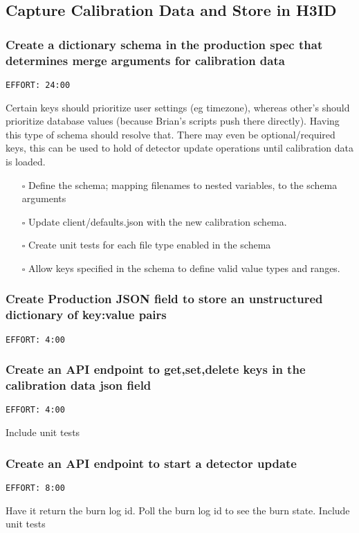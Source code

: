 \documentclass[11pt]{article}
\begin{document}
\subsection{Capture Calibration Data and Store in H3ID}
\label{sec:orgfa391fa}
\subsubsection{Create a dictionary schema in the production spec that determines merge arguments for calibration data}
\label{sec:org3dd4fc3}
\begin{verbatim}
EFFORT: 24:00
\end{verbatim}
Certain keys should prioritize user settings (eg timezone), whereas other's should prioritize
database values (because Brian's scripts push there directly). Having this type of schema should
resolve that.  There may even be optional/required keys, this can be used to hold of detector update
operations until calibration data is loaded.

\begin{itemize}
\item[{$\square$}] Define the schema; mapping filenames to nested variables, to the schema arguments
\item[{$\square$}] Update client/defaults.json with the new calibration schema.
\item[{$\square$}] Create unit tests for each file type enabled in the schema
\item[{$\square$}] Allow keys specified in the schema to define valid value types and ranges.
\end{itemize}
\subsubsection{Create Production JSON field to store an unstructured dictionary of key:value pairs}
\label{sec:org6345b2c}
\begin{verbatim}
EFFORT: 4:00
\end{verbatim}
\subsubsection{Create an API endpoint to get,set,delete keys in the calibration data json field}
\label{sec:org42104a5}
\begin{verbatim}
EFFORT: 4:00
\end{verbatim}
Include unit tests
\subsubsection{Create an API endpoint to start a detector update}
\label{sec:orgc6a5ceb}
\begin{verbatim}
EFFORT: 8:00
\end{verbatim}
Have it return the burn log id. Poll the burn log id to see the burn state. Include unit tests
\end{document}
